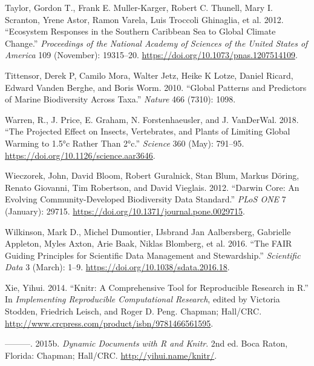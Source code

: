 \documentclass[
]{book}
\newlength{\cslhangindent}
\newlength{\cslentryspacingunit} %
\newenvironment{CSLReferences}[2] %
 {%
  \setlength{\parindent}{0pt}
  \ifodd #1
  \let\oldpar\par
  \def\par{\hangindent=\cslhangindent\oldpar}
  \fi
  \setlength{\parskip}{#2\cslentryspacingunit}
 }%
 {}
\begin{document}
\begin{CSLReferences}{1}{0}
\leavevmode{}%
Taylor, Gordon T., Frank E. Muller-Karger, Robert C. Thunell, Mary I. Scranton, Yrene Astor, Ramon Varela, Luis Troccoli Ghinaglia, et al. 2012. {``Ecosystem Responses in the Southern Caribbean Sea to Global Climate Change.''} \emph{Proceedings of the National Academy of Sciences of the United States of America} 109 (November): 19315--20. \url{https://doi.org/10.1073/pnas.1207514109}.

\leavevmode{}%
Tittensor, Derek P, Camilo Mora, Walter Jetz, Heike K Lotze, Daniel Ricard, Edward Vanden Berghe, and Boris Worm. 2010. {``Global Patterns and Predictors of Marine Biodiversity Across Taxa.''} \emph{Nature} 466 (7310): 1098.

\leavevmode{}%
Warren, R., J. Price, E. Graham, N. Forstenhaeusler, and J. VanDerWal. 2018. {``The Projected Effect on Insects, Vertebrates, and Plants of Limiting Global Warming to 1.5°c Rather Than 2°c.''} \emph{Science} 360 (May): 791--95. \url{https://doi.org/10.1126/science.aar3646}.

\leavevmode{}%
Wieczorek, John, David Bloom, Robert Guralnick, Stan Blum, Markus Döring, Renato Giovanni, Tim Robertson, and David Vieglais. 2012. {``Darwin Core: An Evolving Community-Developed Biodiversity Data Standard.''} \emph{PLoS ONE} 7 (January): 29715. \url{https://doi.org/10.1371/journal.pone.0029715}.

\leavevmode{}%
Wilkinson, Mark D., Michel Dumontier, IJsbrand Jan Aalbersberg, Gabrielle Appleton, Myles Axton, Arie Baak, Niklas Blomberg, et al. 2016. {``The FAIR Guiding Principles for Scientific Data Management and Stewardship.''} \emph{Scientific Data} 3 (March): 1--9. \url{https://doi.org/10.1038/sdata.2016.18}.

\leavevmode{}%
Xie, Yihui. 2014. {``Knitr: A Comprehensive Tool for Reproducible Research in {R}.''} In \emph{Implementing Reproducible Computational Research}, edited by Victoria Stodden, Friedrich Leisch, and Roger D. Peng. Chapman; Hall/CRC. \url{http://www.crcpress.com/product/isbn/9781466561595}.

\leavevmode{}%
---------. 2015b. \emph{Dynamic Documents with {R} and Knitr}. 2nd ed. Boca Raton, Florida: Chapman; Hall/CRC. \url{http://yihui.name/knitr/}.


\end{CSLReferences}
\end{document}
